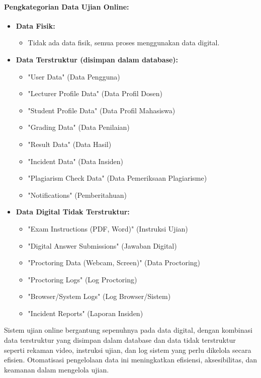 \paragraph{Pengkategorian Data Ujian Online:}
\begin{itemize}
	\item \textbf{Data Fisik:}
	\begin{itemize}
		\item Tidak ada data fisik, semua proses menggunakan data digital.
	\end{itemize}
	\item \textbf{Data Terstruktur (disimpan dalam database):}
	\begin{itemize}
		\item "User Data" (Data Pengguna)
		\item "Lecturer Profile Data" (Data Profil Dosen)
		\item "Student Profile Data" (Data Profil Mahasiswa)
		\item "Grading Data" (Data Penilaian)
		\item "Result Data" (Data Hasil)
		\item "Incident Data" (Data Insiden)
		\item "Plagiarism Check Data" (Data Pemeriksaan Plagiarisme)
		\item "Notifications" (Pemberitahuan)
	\end{itemize}
	\item \textbf{Data Digital Tidak Terstruktur:}
	\begin{itemize}
		\item "Exam Instructions (PDF, Word)" (Instruksi Ujian)
		\item "Digital Answer Submissions" (Jawaban Digital)
		\item "Proctoring Data (Webcam, Screen)" (Data Proctoring)
		\item "Proctoring Logs" (Log Proctoring)
		\item "Browser/System Logs" (Log Browser/Sistem)
		\item "Incident Reports" (Laporan Insiden)
	\end{itemize}
\end{itemize}

Sistem ujian online bergantung sepenuhnya pada data digital, dengan kombinasi data terstruktur yang disimpan dalam database dan data tidak terstruktur seperti rekaman video, instruksi ujian, dan log sistem yang perlu dikelola secara efisien. Otomatisasi pengelolaan data ini meningkatkan efisiensi, aksesibilitas, dan keamanan dalam mengelola ujian.

